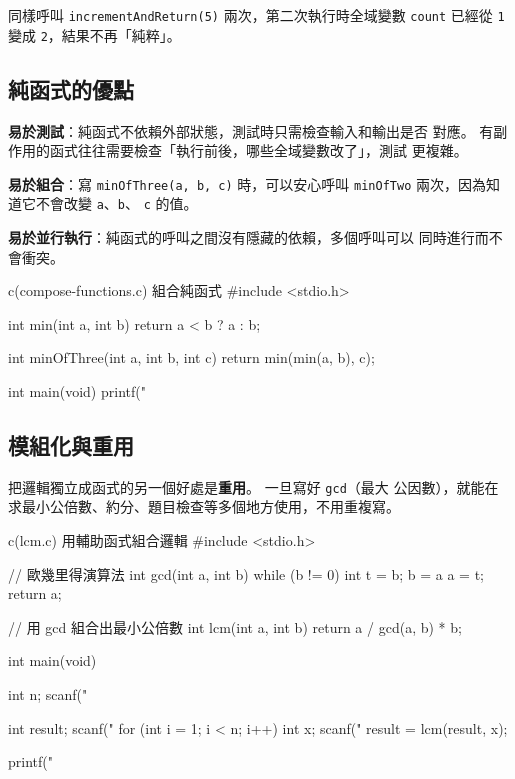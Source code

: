 
同樣呼叫 \texttt{incrementAndReturn(5)} 兩次，第二次執行時全域變數
\texttt{count} 已經從 \texttt{1} 變成 \texttt{2}，結果不再「純粹」。

\subsection{純函式的優點}

\textbf{易於測試}：純函式不依賴外部狀態，測試時只需檢查輸入和輸出是否
對應。 有副作用的函式往往需要檢查「執行前後，哪些全域變數改了」，測試
更複雜。

\textbf{易於組合}：寫 \texttt{minOfThree(a, b, c)} 時，可以安心呼叫
\texttt{minOfTwo} 兩次，因為知道它不會改變 \texttt{a}、\texttt{b}、
\texttt{c} 的值。

\textbf{易於並行執行}：純函式的呼叫之間沒有隱藏的依賴，多個呼叫可以
同時進行而不會衝突。

\begin{example}{c}{(compose-functions.c) 組合純函式}
#include <stdio.h>

int min(int a, int b) {
    return a < b ? a : b;
}

int minOfThree(int a, int b, int c) {
    return min(min(a, b), c);
}

int main(void) {
    printf("%
}
\end{example}


\subsection{模組化與重用}

把邏輯獨立成函式的另一個好處是\textbf{重用}。 一旦寫好 \texttt{gcd}（最大
公因數），就能在求最小公倍數、約分、題目檢查等多個地方使用，不用重複寫。

\begin{example}{c}{(lcm.c) 用輔助函式組合邏輯}
#include <stdio.h>

// 歐幾里得演算法
int gcd(int a, int b) {
    while (b != 0) {
        int t = b;
        b = a %
        a = t;
    }
    return a;
}

// 用 gcd 組合出最小公倍數
int lcm(int a, int b) {
    return a / gcd(a, b) * b;
}

int main(void) {
    int n;
    scanf("%

    int result;
    scanf("%
    for (int i = 1; i < n; i++) {
        int x;
        scanf("%
        result = lcm(result, x);
    }

    printf("%
}
\end{example}

